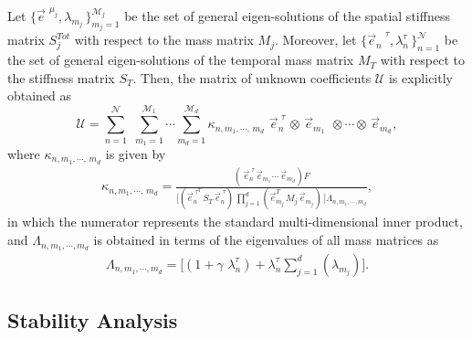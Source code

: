 %
\begin{thm}
	\label{Thm: fast solver}
	Let $\{ {\vec{e}_{}}^{\,\,\mu_j}    ,    \lambda^{}_{m_j}\,  \}_{m_j=1}^{\mathcal{M}_j}$ be the set of general eigen-solutions of the spatial stiffness matrix $S^{Tot}_j$ with respect to the mass matrix $M_{j}$. Moreover, let $\{ {\vec{e}_{n}}^{\,\,\tau}    ,    \lambda^{\tau}_{n}\,  \}_{n=1}^{\mathcal{N}}$ be the set of general eigen-solutions of the temporal mass matrix $M_{T}$ with respect to the stiffness matrix $S_{T}$. Then, the matrix of unknown coefficients $\mathcal{U}$ is explicitly obtained as
	\begin{equation}
	\label{Eq: thm u expression in terms of k}
	\mathcal{U} = 
	\sum_{n=1}^{\mathcal{N}}
	\,\,
	\sum_{m_1= 1}^{\mathcal{M}_1}
	\cdots 
	\sum_{m_d= 1}^{\mathcal{M}_d}
	\kappa_{ n,m_1,\cdots,\,m_d  } \,
	\,\vec{e}_n^{\,\,\tau}\,
	\otimes
	\,{\vec{e}_{m_1}}^{}\,\,
	\otimes
	\cdots
	\otimes
	\,{\vec{e}_{m_d}}^{},
	\end{equation}
	where $\kappa_{ n,m_1,\cdots,\,m_d }$ is given by 
	\begin{eqnarray}
	\label{Eq: thm k fraction_1}
	\kappa_{ n,m_1,\cdots,\,m_d  } =  \frac{(\,\vec{e}_n^{\,\,\tau}
		\,{\vec{e}_{m_1}}^{}
		\cdots
		\,{\vec{e}_{m_d}}^{}) F}
	{
		\Big[
		(\vec{e}_n^{\,\,\tau^T} \, S_{T} \, \vec{e}_n^{\,\,\tau}) \,
		\prod_{j=1}^{d} (\vec{e}_{m_j}^{T}  \,  M_{j} \,  {\vec{e}_{m_j}}^{}) \,
		\Big]
		\Lambda_{n,m_1,\cdots,m_d}
	},
	\end{eqnarray}
	in which the numerator represents the standard multi-dimensional inner product, and $\Lambda_{n,m_1,\cdots,m_d}$ is obtained in terms of the eigenvalues of all mass matrices as
	\begin{eqnarray}
	\nonumber
	&\Lambda_{n,m_1,\cdots, m_d} = \Big[
	(1+\gamma\,\, 
	\lambda^{\tau}_n)
	+
	\lambda^{\tau}_n
	\sum_{j=1}^{d}
	(
	\lambda^{}_{m_j}
	)
	\Big].  &
	\end{eqnarray}
	
\end{thm}

%
%
%
%
%
\subsection{Stability Analysis}
\label{Sec: Stability and Convergence of PG}
%
%


